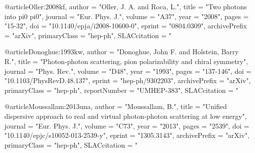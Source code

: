 @article{Oller:2008kf,
	author         = "Oller, J. A. and Roca, L.",
	title          = "{Two photons into pi0 pi0}",
	journal        = "Eur. Phys. J.",
	volume         = "A37",
	year           = "2008",
	pages          = "15-32",
	doi            = "10.1140/epja/i2008-10600-0",
	eprint         = "0804.0309",
	archivePrefix  = "arXiv",
	primaryClass   = "hep-ph",
	SLACcitation   = "%
}

@article{Donoghue:1993kw,
	author         = "Donoghue, John F. and Holstein, Barry R.",
	title          = "{Photon-photon scattering, pion polarizability and chiral
		symmetry}",
	journal        = "Phys. Rev.",
	volume         = "D48",
	year           = "1993",
	pages          = "137-146",
	doi            = "10.1103/PhysRevD.48.137",
	eprint         = "hep-ph/9302203",
	archivePrefix  = "arXiv",
	primaryClass   = "hep-ph",
	reportNumber   = "UMHEP-383",
	SLACcitation   = "%
}

@article{Moussallam:2013una,
	author         = "Moussallam, B.",
	title          = "{Unified dispersive approach to real and virtual
		photon-photon scattering at low energy}",
	journal        = "Eur. Phys. J.",
	volume         = "C73",
	year           = "2013",
	pages          = "2539",
	doi            = "10.1140/epjc/s10052-013-2539-y",
	eprint         = "1305.3143",
	archivePrefix  = "arXiv",
	primaryClass   = "hep-ph",
	SLACcitation   = "%
}